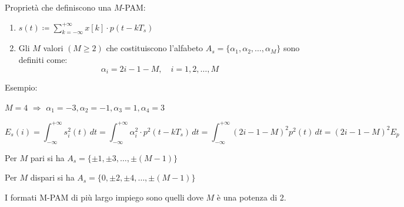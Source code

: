\documentclass{article}
\begin{document}
\begin{center}
\end{center}

Proprietà che definiscono una \( M \)-PAM:

\begin{enumerate}
    \item \( s(t) \coloneqq \sum_{k=-\infty}^{+\infty} x[k]\cdot p(t - kT_s) \)
    \item Gli \( M \) valori \( (M \geq 2) \) che costituiscono l'alfabeto \( A_s = \{ \alpha_1, \alpha_2, \ldots, \alpha_M \} \) sono definiti come:
    \[ \alpha_i = 2i - 1 - M, \quad i = 1, 2, \ldots, M \]
\end{enumerate}

Esempio:

\( M=4 \) $\Rightarrow$ \( \alpha_1 = -3, \alpha_2 = -1, \alpha_3 = 1, \alpha_4 = 3 \)

\begin{center}
\end{center}
\[
E_s(i) = \int_{-\infty}^{+\infty} s_i^2(t) \, dt =  \int_{-\infty}^{+\infty} \alpha_i^2 \cdot p^2(t - kT_s) \, dt = \int_{-\infty}^{+\infty} (2i - 1 - M)^2 p^2(t) \, dt = (2i - 1 - M)^2 E_p
\]

Per \( M \) pari si ha \( A_s = \{ \pm 1, \pm 3, \ldots, \pm (M-1) \} \)

Per \( M \) dispari si ha \( A_s = \{ 0, \pm 2, \pm 4, \ldots, \pm (M-1) \} \)


I formati M-PAM di pi\`u largo impiego sono quelli dove $M$ è una potenza di 2.
\end{document}
